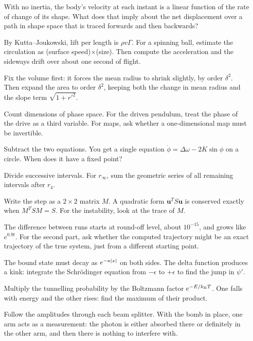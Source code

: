 
 With no inertia, the body's velocity at each instant is a linear function of the rate of change of its shape. What does that imply about the net displacement over a path in shape space that is traced forwards and then backwards?

 By Kutta--Joukowski, lift per length is $\rho v\Gamma$. For a spinning ball, estimate the circulation as (surface speed)$\times$(size). Then compute the acceleration and the sideways drift over about one second of flight.

 Fix the volume first: it forces the mean radius to shrink slightly, by order $\delta^2$. Then expand the area to order $\delta^2$, keeping both the change in mean radius and the slope term $\sqrt{1+r'^2}$.


 Count dimensions of phase space. For the driven pendulum, treat the phase of the drive as a third variable. For maps, ask whether a one-dimensional map must be invertible.

 Subtract the two equations. You get a single equation $\dot\phi = \Delta\omega - 2K\sin\phi$ on a circle. When does it have a fixed point?

 Divide successive intervals. For $r_\infty$, sum the geometric series of all remaining intervals after $r_4$.


 Write the step as a $2\times2$ matrix $M$. A quadratic form $\mathbf{u}^TS\mathbf{u}$ is conserved exactly when $M^TSM = S$. For the instability, look at the trace of $M$.

 The difference between runs starts at round-off level, about $10^{-15}$, and grows like $e^{0.9t}$. For the second part, ask whether the computed trajectory might be an exact trajectory of the true system, just from a different starting point.


 The bound state must decay as $e^{-\kappa\left\lvert x\right\rvert}$ on both sides. The delta function produces a kink: integrate the Schr\"odinger equation from $-\epsilon$ to $+\epsilon$ to find the jump in $\psi'$.

 Multiply the tunnelling probability by the Boltzmann factor $e^{-E/k_{\mathrm{B}} T}$. One falls with energy and the other rises: find the maximum of their product.

 Follow the amplitudes through each beam splitter. With the bomb in place, one arm acts as a measurement: the photon is either absorbed there or definitely in the other arm, and then there is nothing to interfere with.
